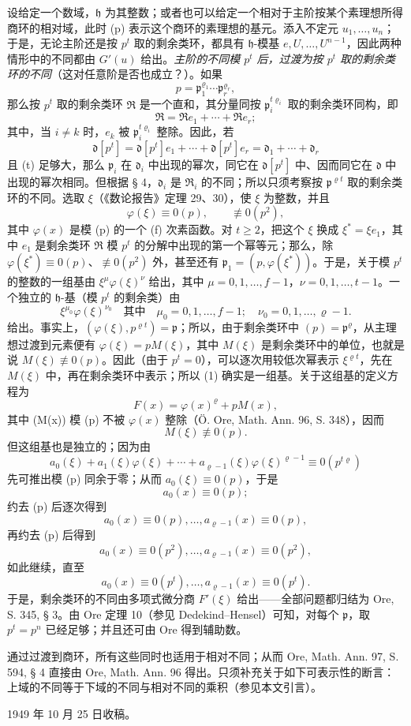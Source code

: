 设给定一个数域，\(\mathfrak h\) 为其整数；或者也可以给定一个相对于主阶按某个素理想所得商环的相对域，此时 (p) 表示这个商环的素理想的基元。添入不定元 \(u_1,\ldots,u_n\)；于是，无论主阶还是按 \(p^t\) 取的剩余类环，都具有 \(\mathfrak h\)-模基 \(e,U,\ldots,U^{n-1}\)，因此两种情形中的不同都由 \(G'(u)\) 给出。\emph{主阶的不同模 \(p^t\) 后，过渡为按 \(p^t\) 取的剩余类环的不同}（这对任意阶是否也成立？）。如果
\[
p=\mathfrak p_1^{\varrho_1}\cdots\mathfrak p_r^{\varrho_r},
\]
那么按 \(p^t\) 取的剩余类环 \(\mathfrak R\) 是一个直和，其分量同按 \(\mathfrak p_i^{t\varrho_i}\) 取的剩余类环同构，即
\[
\mathfrak R=\mathfrak R e_1+\cdots+\mathfrak R e_r;
\]
其中，当 \(i\ne k\) 时，\(e_k\) 被 \(\mathfrak p_i^{t\varrho_i}\) 整除。因此，若
\[
\mathfrak d[p^t]=\mathfrak d[p^t]e_1+\cdots+\mathfrak d[p^t]e_r
=\mathfrak d_1+\cdots+\mathfrak d_r
\]
且 (t) 足够大，那么 \(\mathfrak p_i\) 在 \(\mathfrak d_i\) 中出现的幂次，同它在 \(\mathfrak d[p^t]\) 中、因而同它在 \(\mathfrak d\) 中出现的幂次相同。但根据 § 4，\(\mathfrak d_i\) 是 \(\mathfrak R_i\) 的不同；所以只须考察按 \(\mathfrak p^{\varrho t}\) 取的剩余类环的不同。选取 \(\xi\)（《数论报告》定理 29、30），使 \(\xi\) 为整数，并且
\[
\varphi(\xi)\equiv0(p),
\qquad \not\equiv0(p^2),
\]
其中 \(\varphi(x)\) 是模 (p) 的一个 (f) 次素函数。对 \(t\ge2\)，把这个 \(\xi\) 换成 \(\xi^*=\xi e_1\)，其中 \(e_1\) 是剩余类环 \(\mathfrak R\) 模 \(p^t\) 的分解中出现的第一个幂等元；那么，除 \(\varphi(\xi^*)\equiv0(p)\)、\(\not\equiv0(p^2)\) 外，甚至还有 \(\mathfrak p_1=(p,\varphi(\xi^*))\)。于是，关于模 \(p^t\) 的整数的一组基由 \(\xi^\mu\varphi(\xi)^\nu\) 给出，其中 \(\mu=0,1,\ldots,f-1\)，\(\nu=0,1,\ldots,t-1\)。一个独立的 \(\mathfrak h\)-基（模 \(p^t\) 的剩余类）由
\begin{equation}
\xi^{\mu_0}\varphi(\xi)^{\nu_0}
\quad\text{其中}\quad
\mu_0=0,1,\ldots,f-1;
\quad \nu_0=0,1,\ldots,\varrho-1. \tag{1}
\end{equation}
给出。事实上，\((\varphi(\xi),p^{\varrho t})=\mathfrak p\)；所以，由于剩余类环中 \((p)=\mathfrak p^\varrho\)，从主理想过渡到元素便有 \(\varphi(\xi)=pM(\xi)\)，其中 \(M(\xi)\) 是剩余类环中的单位，也就是说 \(M(\xi)\not\equiv0(p)\)。因此（由于 \(p^t=0\)），可以逐次用较低次幂表示 \(\xi^{\varrho t}\)，先在 \(M(\xi)\) 中，再在剩余类环中表示；所以 (1) 确实是一组基。关于这组基的定义方程为
\[
F(x)=\varphi(x)^\varrho+pM(x),
\]
其中 (M(x)) 模 (p) 不被 \(\varphi(x)\) 整除（Ö. Ore, Math. Ann. 96, S. 348），因而
\[
M(\xi)\not\equiv0(p).
\]
但这组基也是独立的；因为由
\[
a_0(\xi)+a_1(\xi)\varphi(\xi)+\cdots+a_{\varrho-1}(\xi)\varphi(\xi)^{\varrho-1}
\equiv0(p^{t\varrho})
\]
先可推出模 (p) 同余于零；从而 \(a_0(\xi)\equiv0(p)\)，于是
\[
a_0(x)\equiv0(p);
\]
约去 (p) 后逐次得到
\[
a_0(x)\equiv0(p),\ldots,a_{\varrho-1}(x)\equiv0(p),
\]
再约去 (p) 后得到
\[
a_0(x)\equiv0(p^2),\ldots,a_{\varrho-1}(x)\equiv0(p^2),
\]
如此继续，直至
\[
a_0(x)\equiv0(p^t),\ldots,a_{\varrho-1}(x)\equiv0(p^t).
\]
于是，剩余类环的不同由多项式微分商 \(F'(\xi)\) 给出——全部问题都归结为 Ore, S. 345, § 3。由 Ore 定理 10（参见 Dedekind--Hensel）可知，对每个 \(\mathfrak p\)，取 \(p^t=p^n\) 已经足够；并且还可由 Ore 得到辅助数。

通过过渡到商环，所有这些同时也适用于相对不同；从而 Ore, Math. Ann. 97, S. 594, § 4 直接由 Ore, Math. Ann. 96 得出。只须补充关于如下可表示性的断言：上域的不同等于下域的不同与相对不同的乘积（参见本文引言）。

\begin{center}
1949 年 10 月 25 日收稿。
\end{center}
